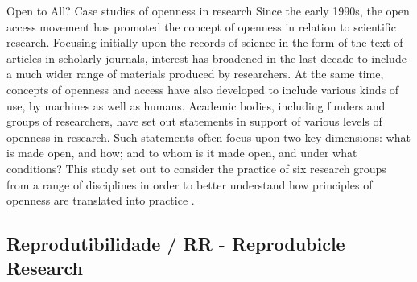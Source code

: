 Open to All?  Case studies of openness in research
Since the early 1990s, the open access movement has promoted the concept of openness in relation
to scientific research. Focusing initially upon the records of science in the form of the text of articles
in scholarly journals, interest has broadened in the last decade to include a much wider range of
materials produced by researchers. At the same time, concepts of openness and access have also
developed to include various kinds of use, by machines as well as humans.
Academic bodies, including funders and groups of researchers, have set out statements in support
of various levels of openness in research. Such statements often focus upon two key dimensions:
what is made open, and how; and to whom is it made open, and under what conditions? This study
set out to consider the practice of six research groups from a range of disciplines in order to better
understand how principles of openness are translated into practice \cite{Nesta2010}.

\subsection{Reprodutibilidade / RR - Reprodubicle Research}

